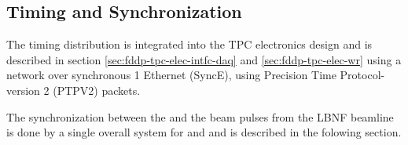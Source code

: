 \subsection{Timing and Synchronization}
\label{sec:fd-daq-timing}


The timing distribution is integrated into the TPC electronics design
and is described in section \ref{sec:fddp-tpc-elec-intfc-daq} and
\ref{sec:fddp-tpc-elec-wr} using a  network over
synchronous \SI{1}{\Gbps} Ethernet (SyncE), using Precision Time Protocol-version 2 (PTPV2) packets.

The synchronization between the  and the beam pulses from
the LBNF beamline is done by a single overall system for \single 
and \dual  and is described in the folowing section.


